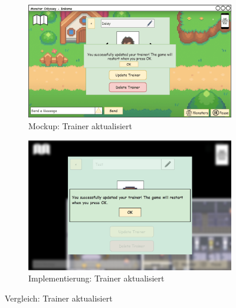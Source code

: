 \begin{figure}[H]
    \centering
    \begin{subfigure}[b]{0.4\textwidth}
        \includegraphics[width=\textwidth]{images/mockups/Bonusfeatures/TrainerSettings/TrainerSettingChanged.png}
        \caption{Mockup: \phantom{Trainer} Trainer aktualisiert}
        \label{fig: Mockup: Trainer aktualisiert}
    \end{subfigure}
    \hfill
    \begin{subfigure}[b]{0.4\textwidth}
        \includegraphics[width=\textwidth]{images/implementation/Bonusfeatures/TrainerSettings/UpdateTrainer.png}
        \caption{Implementierung: Trainer aktualisiert}
        \label{fig: Implementierung: Trainer aktualisiert}
    \end{subfigure}
    \caption{Vergleich: Trainer aktualisiert}
    \label{fig: Vergleich: Trainer aktualisiert}
\end{figure}
